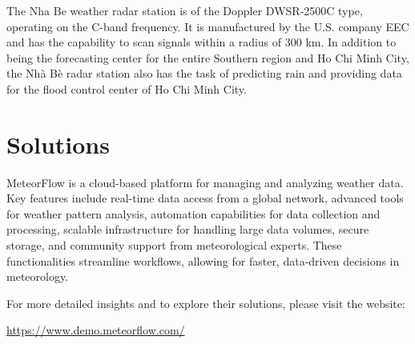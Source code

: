 The Nha Be weather radar station is of the Doppler DWSR-2500C type, operating on
the C-band frequency. It is manufactured by the U.S. company EEC and has the
capability to scan signals within a radius of 300 km. In addition to being the
forecasting center for the entire Southern region and Ho Chi Minh City, the Nhà
Bè radar station also has the task of predicting rain and providing data for the
flood control center of Ho Chi Minh City.


\section{Solutions}

MeteorFlow is a cloud-based platform for managing and analyzing weather data.
Key features include real-time data access from a global network, advanced tools
for weather pattern analysis, automation capabilities for data collection and
processing, scalable infrastructure for handling large data volumes, secure
storage, and community support from meteorological experts. These
functionalities streamline workflows, allowing for faster, data-driven decisions
in meteorology.

For more detailed insights and to explore their solutions, please visit the website:

\url{https://www.demo.meteorflow.com/}